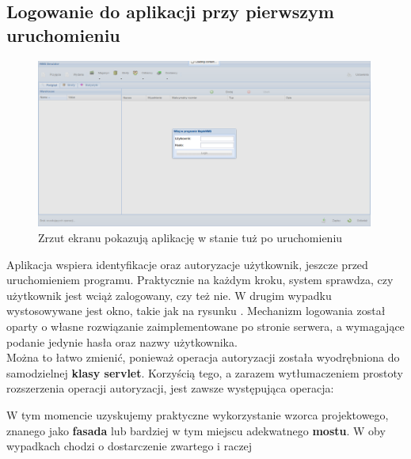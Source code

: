 	\subsection{Logowanie do aplikacji przy pierwszym uruchomieniu}
		\begin{figure}[H]
			\centering
			\includegraphics[width=0.99\textwidth]{images/app/login}
			\caption[Aplikacja - Logowanie do programu]{Zrzut ekranu pokazują aplikację w stanie tuż po uruchomieniu}
			\label{c7:fig:app:login}
		\end{figure}
		Aplikacja wspiera identyfikacje oraz autoryzacje użytkownik, jeszcze przed uruchomieniem programu. Praktycznie
		na każdym kroku, system sprawdza, czy użytkownik jest wciąż zalogowany, czy też nie. W drugim wypadku
		wystosowywane jest okno, takie jak na rysunku \label{c7:fig:app::login}. Mechanizm logowania został oparty
		o własne rozwiązanie zaimplementowane po stronie serwera, a wymagające podanie jedynie hasła oraz 
		nazwy użytkownika.\\ Można to łatwo zmienić, ponieważ operacja autoryzacji została wyodrębniona
		do samodzielnej \textbf{klasy servlet}. Korzyścią tego, a zarazem wytłumaczeniem prostoty rozszerzenia
		operacji autoryzacji, jest zawsze występująca operacja:
		W tym momencie uzyskujemy praktyczne wykorzystanie wzorca projektowego, znanego jako \textbf{fasada} lub bardziej
		w tym miejscu adekwatnego \textbf{mostu}. W oby wypadkach chodzi o dostarczenie zwartego i raczej 
